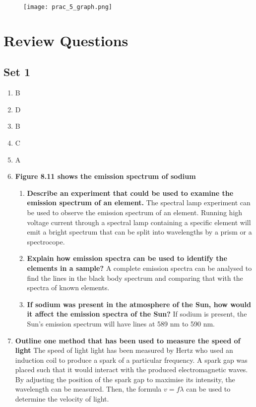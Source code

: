 \documentclass{report}
\begin{document}
			\begin{figure}[H]
				\centering
				\texttt{[image: prac\_5\_graph.png]}
			\end{figure}

\newpage

\chapter{Review Questions}

	\section{Set 1}
		\begin{enumerate}
			\item B
			\item D
			\item B
			\item C
			\item A
			\item \textbf{Figure 8.11 shows the emission spectrum of sodium}
				\begin{enumerate}
					\item \textbf{Describe an experiment that could be used to examine the emission spectrum of an element.}
						\subitem The spectral lamp experiment can be used to observe the emission spectrum of an element. Running high voltage current through a spectral lamp containing a specific element will emit a bright spectrum that can be split into wavelengths by a prism or a spectrocope.

					\item \textbf{Explain how emission spectra can be used to identify the elements in a sample?}
						\subitem A complete emission spectra can be analysed to find the lines in the black body spectrum and comparing that with the spectra of known elements.

					\item \textbf{If sodium was present in the atmosphere of the Sun, how would it affect the emission spectra of the Sun?}
						\subitem If sodium is present, the Sun's emission spectrum will have lines at 589 nm to 590 nm.
				\end{enumerate}

			\item \textbf{Outline one method that has been used to measure the speed of light}
				\subitem The speed of light light has been measured by Hertz who used an induction coil to produce a spark of a particular frequency. A spark gap was placed such that it would interact with the produced electromagnetic waves. By adjusting the position of the spark gap to maximise its intensity, the wavelength can be measured. Then, the formula $v=f \lambda$ can be used to determine the velocity of light.


\end{enumerate}
\end{document}
